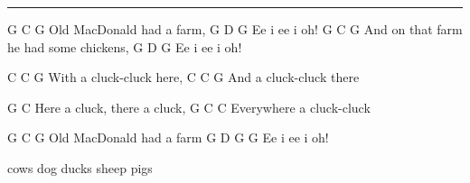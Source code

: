 \noindent\rule{\columnwidth}{1pt}

\begin{lstsong}
G             C     G
Old MacDonald had a farm,
G    D    G
Ee i ee i oh!
G                   C        G
And on that farm he had some chickens,
G    D    G
Ee i ee i oh!

       C     C     G
With a cluck-cluck here,
      C     C     G
And a cluck-cluck there

G             C
Here a cluck, there a cluck,
G            C     C
Everywhere a cluck-cluck

G             C     G
Old MacDonald had a farm
G    D    G    G
Ee i ee i oh!

cows
dog
ducks
sheep
pigs
\end{lstsong}
\newpage
